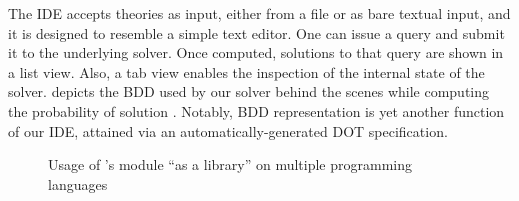 \documentclass[12pt,a4paper,openright,twoside]{book}
\begin{document}
%
The IDE accepts \problog{} theories as input, either from a file or as bare textual input, and it is designed to resemble a simple text editor.
%
One can issue a query and submit it to the underlying \problog{} solver.
%
Once computed, solutions to that query are shown in a list view.
%
Also, a tab view enables the inspection of the internal state of the solver.
%
 depicts the BDD used by our \problog{} solver behind the scenes while computing the probability of solution .
%
Notably, BDD representation is yet another function of our IDE, attained via an automatically-generated  DOT \cite{gansner-00} specification.

\begin{figure}
        
        
    
\caption{Usage of \twopkt's \problog{} module ``as a library'' on multiple programming languages}
\label{fig:problog-as-a-library}
\end{figure}
\end{document}
